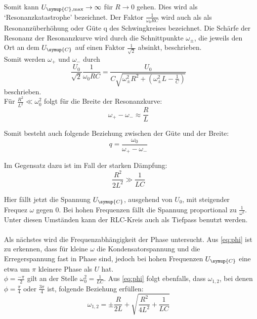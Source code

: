     \noindent Somit kann $U_{\symup{C},\text{max}} \to \infty$ für $R \to 0$ gehen. Dies wird als \enquote*{Resonanzkatastrophe} bezeichnet. Der Faktor
    $\frac{1}{\omega_0 RC}$ wird auch als als Resonanzüberhöhung oder Güte q des Schwingkreises bezeichnet. Die Schärfe der Resonanz 
    der Resonanzkurve wird durch die Schnittpunkte $\omega_{\pm}$, die jeweils den Ort an dem $U_{\symup{C}}$ auf einen Faktor $\frac{1}{\sqrt{2}}$ 
    absinkt, beschrieben.\\
    Somit werden $\omega_+$ und $\omega_-$ durch 
    \begin{equation}
        \frac{U_0}{\sqrt{2}} \frac{1}{\omega_0 RC} = \frac{U_0}{C \sqrt{\omega^2_{\pm} R^2 + \left( \omega^2_{\pm}L - \frac{1}{C} \right) }} \nonumber
    \end{equation}
    beschrieben.\\

    \noindent Für $\frac{R^2}{L^2} \ll {\omega}^2_0$ folgt für die Breite der Resonanzkurve:
    \begin{equation}
        \omega_+ - \omega_- \approx \frac{R}{L} 
        \label{eq:v1}
    \end{equation}

    \noindent Somit besteht auch folgende Beziehung zwischen der Güte und der Breite:
    \begin{equation}
        q = \frac{\omega_0}{\omega_+ - \omega_-} \nonumber
    \end{equation}

    \noindent Im Gegensatz dazu ist im Fall der starken Dämpfung:
    \begin{equation}
        \frac{R^2}{2L^2} \gg \frac{1}{LC} \nonumber
    \end{equation}

    \noindent Hier fällt jetzt die Spannung $U_{\symup{C}}$, ausgehend von $U_0$, mit steigender Frequez $\omega$ gegen 0. Bei hohen Frequenzen fällt
    die Spannung proportional zu $\frac{1}{\omega^2}$. Unter diesen Umständen kann der RLC-Kreis auch als Tiefpass benutzt werden.
    \\\\
    \noindent Als nächstes wird die Frequenzabhängigkeit der Phase untersucht. Aus \ref{eq:phi} ist zu erkennen, dass für kleine $\omega$ die 
    Kondensatorspannung und die Erregerspannung fast in Phase sind, jedoch bei hohen Frequenzen $U_{\symup{C}}$ eine etwa um $\pi$ 
    kleinere Phase als $U$ hat.\\
    $\phi=\frac{-\pi}{2}$ gilt an der Stelle $\omega^2_0 = \frac{1}{LC}$.
    Aus \ref{eq:phi} folgt ebenfalls, dass $\omega_{1,2}$, bei denen $\phi= \frac{\pi}{4} \text{ oder } \frac{3\pi}{4}$ ist, folgende Beziehung erfüllen:
    \begin{equation}
        \omega_{1,2} = \pm  \frac{R}{2L} + \sqrt{\frac{R^2}{4L^2}+ \frac{1}{LC}} \nonumber
    \end{equation}

